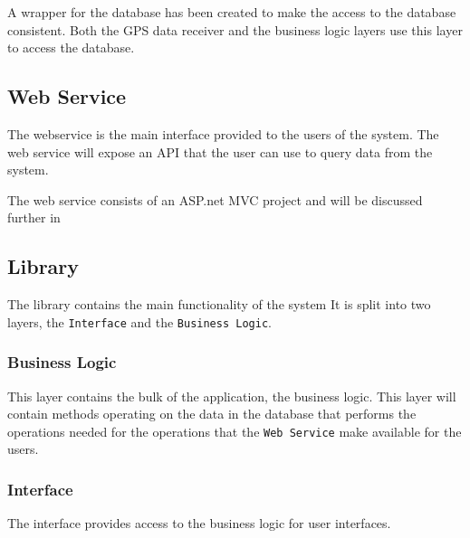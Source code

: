 A wrapper for the database has been created to make the access to the database consistent. 
Both the GPS data receiver and the business logic layers use this layer to access the database.

\subsection{Web Service}
The webservice is the main interface provided to the users of the system.
The web service will expose an API that the user can use to query data from the system.

The web service consists of an ASP.net MVC project and will be discussed further in 

\subsection{Library}
The library contains the main functionality of the system 
It is split into two layers, the \texttt{Interface} and the \texttt{Business Logic}.

\subsubsection{Business Logic}
This layer contains the bulk of the application, the business logic.
This layer will contain methods operating on the data in the database that performs the operations needed for the operations that the \texttt{Web Service} make available for the users.

\subsubsection{Interface}
The interface provides access to the business logic for user interfaces.




